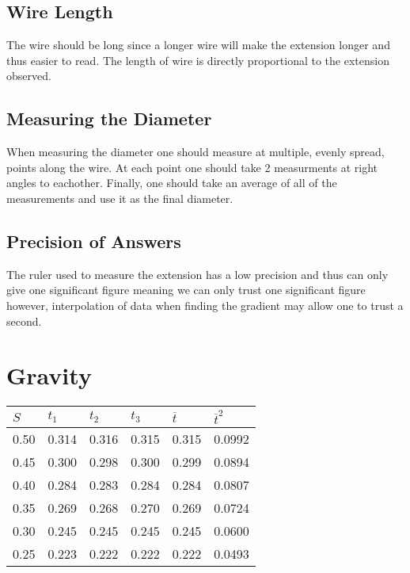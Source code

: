 \documentclass{article}
\begin{document}
\subsection{Wire Length}
The wire should be long since a longer wire will make the extension longer
and thus easier to read. The length of wire is directly proportional to the
extension observed.

\subsection{Measuring the Diameter}
When measuring the diameter one should measure at multiple, evenly spread, points along the wire.
At each point one should take 2 measurments at right angles to eachother. Finally, one should
take an average of all of the measurements and use it as the final diameter.

\subsection{Precision of Answers}
The ruler used to measure the extension has a low precision and thus
can only give one significant figure meaning we can only trust one
significant figure however, interpolation of data when finding
the gradient may allow one to trust a second.

\section{Gravity}

\begin{center}
    \begin{tabular}{l|l|l|l|l|l}
     $S$ & $t_1$ & $t_2$ & $t_3$ & $\overline{t}$ & ${\overline{t}}^2$\\ \hline
     0.50 & 0.314 & 0.316 & 0.315 & 0.315 & 0.0992 \\
     0.45 & 0.300 & 0.298 & 0.300 & 0.299 & 0.0894 \\
     0.40 & 0.284 & 0.283 & 0.284 & 0.284 & 0.0807 \\
     0.35 & 0.269 & 0.268 & 0.270 & 0.269 & 0.0724 \\
     0.30 & 0.245 & 0.245 & 0.245 & 0.245 & 0.0600 \\
     0.25 & 0.223 & 0.222 & 0.222 & 0.222 & 0.0493 \\
    \end{tabular}
\end{center}
\end{document}
